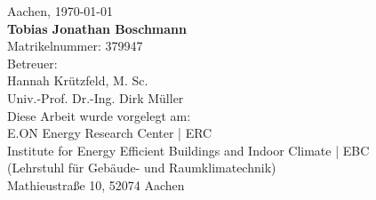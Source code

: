 \begin{titlepage}
\begin{addmargin}[\marginCoverPage]{0cm}
\vfill
\begin{center}
\begingroup
{}\selectfont
Aachen, \monthyeardate\today \\
\addvspace{0.5cm}
\textbf{Tobias Jonathan Boschmann} \\
Matrikelnummer: 379947 \\
\addvspace{0.5cm}
Betreuer:\\
Hannah Krützfeld, M. Sc. \\
Univ.-Prof. Dr.-Ing. Dirk Müller \\
\addvspace{0.5cm}
Diese Arbeit wurde vorgelegt am:\\
E.ON Energy Research Center | ERC \\
Institute for Energy Efficient Buildings and Indoor Climate | EBC\\
(Lehrstuhl für Gebäude- und Raumklimatechnik)\\
Mathieustraße 10, 52074 Aachen\\
\endgroup
\end{center}
\end{addmargin}
\end{titlepage}

